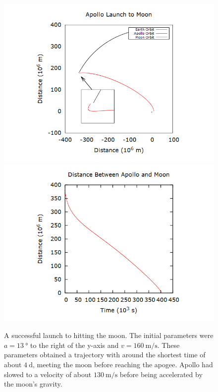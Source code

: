 \documentclass[aps,prl,twocolumn,superscriptaddress]{revtex4-1}
\begin{document}
\begin{figure}[htbp]
  	\begin{center}
 		\includegraphics[scale=0.3]{hit.png}
 		\includegraphics[scale=0.3]{disthit.png}
  		\caption{A successful launch to hitting the moon. The initial parameters were $a = \SI{13}{\degree}$ to the right of the y-axis and $v = \SI{160}{\m\per\s}$. These parameters obtained a trajectory with around the shortest time of about $\SI{4}{\day}$, meeting the moon before reaching the apogee. Apollo had slowed to a velocity of about $\SI{130}{\m\per\s}$ before being accelerated by the moon's gravity.}
  		\label{gr:hit}
 	\end{center}
\end{figure}
\end{document}
